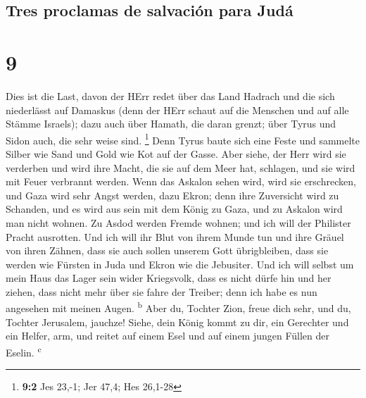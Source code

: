 \hypertarget{tres-proclamas-de-salvaciuxf3n-para-juduxe1}{%
\subsection{Tres proclamas de salvación para
Judá}\label{tres-proclamas-de-salvaciuxf3n-para-juduxe1}}

\hypertarget{section-8}{%
\section{9}\label{section-8}}

 Dies ist die Last, davon der HErr redet über das Land
Hadrach und die sich niederlässt auf Damaskus (denn der HErr schaut auf
die Menschen und auf alle Stämme Israels);  dazu auch über
Hamath, die daran grenzt; über Tyrus und Sidon auch, die sehr weise
sind. \footnote{\textbf{9:2} Jes 23,-1; Jer 47,4; Hes 26,1-28}
 Denn Tyrus baute sich eine Feste und sammelte Silber wie
Sand und Gold wie Kot auf der Gasse.  Aber siehe, der Herr
wird sie verderben und wird ihre Macht, die sie auf dem Meer hat,
schlagen, und sie wird mit Feuer verbrannt werden.  Wenn
das Askalon sehen wird, wird sie erschrecken, und Gaza wird sehr Angst
werden, dazu Ekron; denn ihre Zuversicht wird zu Schanden, und es wird
aus sein mit dem König zu Gaza, und zu Askalon wird man nicht wohnen.
 Zu Asdod werden Fremde wohnen; und ich will der Philister
Pracht ausrotten.  Und ich will ihr Blut von ihrem Munde
tun und ihre Gräuel von ihren Zähnen, dass sie auch sollen unserem Gott
übrigbleiben, dass sie werden wie Fürsten in Juda und Ekron wie die
Jebusiter.  Und ich will selbst um mein Haus das Lager
sein wider Kriegsvolk, dass es nicht dürfe hin und her ziehen, dass
nicht mehr über sie fahre der Treiber; denn ich habe es nun angesehen
mit meinen Augen. \textsuperscript{b}  Aber du, Tochter
Zion, freue dich sehr, und du, Tochter Jerusalem, jauchze! Siehe, dein
König kommt zu dir, ein Gerechter und ein Helfer, arm, und reitet auf
einem Esel und auf einem jungen Füllen der Eselin. \textsuperscript{c}

